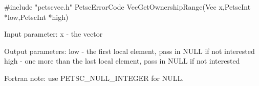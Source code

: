 #include "petscvec.h"   
PetscErrorCode  VecGetOwnershipRange(Vec x,PetscInt *low,PetscInt *high)

Input parameter:
x - the vector

Output parameters:
low  - the first local element, pass in NULL if not interested 
high - one more than the last local element, pass in NULL if not interested

Fortran note:
use PETSC_NULL_INTEGER for NULL.
